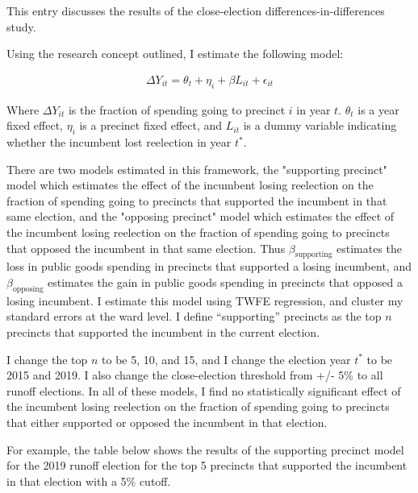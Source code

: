 This entry discusses the results of the close-election differences-in-differences study.

Using the research concept outlined, I estimate the following model:

\begin{equation}
\label{eq:diffindiff}
\begin{split}
\Delta Y_{it} = \theta_t + \eta_i + \beta L_{it} + \epsilon_{it}
\end{split}
\end{equation}

Where $\Delta Y_{it}$ is the fraction of spending going to precinct $i$ in year $t$. $\theta_t$ is a year fixed effect, $\eta_i$ is a precinct fixed effect, and $L_{it}$ is a dummy variable indicating whether the incumbent lost reelection in year $t^*$. 

There are two models estimated in this framework, the "supporting precinct" model which estimates the effect of the incumbent losing reelection on the fraction of spending going to precincts that supported the incumbent in that same election, and the "opposing precinct" model which estimates the effect of the incumbent losing reelection on the fraction of spending going to precincts that opposed the incumbent in that same election.
Thus $\beta_{\text{supporting}}$ estimates the loss in public goods spending in precincts that supported a losing incumbent, and $\beta_{\text{opposing}}$ estimates the gain in public goods spending in precincts that opposed a losing incumbent.
I estimate this model using TWFE regression, and cluster my standard errors at the ward level.
I define ``supporting'' precincts as the top $n$ precincts that supported the incumbent in the current election. 

I change the top $n$ to be 5, 10, and 15, and I change the election year $t^*$ to be 2015 and 2019. 
I also change the close-election threshold from +/- 5\% to all runoff elections.
In all of these models, I find no statistically significant effect of the incumbent losing reelection on the fraction of spending going to precincts that either supported or opposed the incumbent in that election.

For example, the table below shows the results of the supporting precinct model for the 2019 runoff election for the top 5 precincts that supported the incumbent in that election with a 5\% cutoff.


